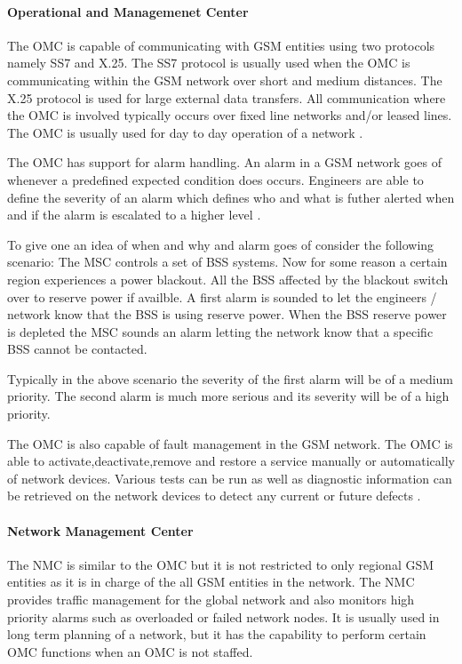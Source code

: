 \paragraph{Operational and Managemenet Center}
The OMC is capable of communicating with GSM entities using two protocols namely SS7 and X.25. The SS7 protocol is usually used when the OMC is communicating within the GSM network over short and medium distances. The X.25 protocol is used for large external data transfers. All communication where the OMC is involved typically occurs over fixed line networks and/or leased lines. The OMC is usually used for day to day operation of a network \cite{GSMSysEngin}.

The OMC has support for alarm handling. An alarm in a GSM network goes of whenever a predefined expected condition does occurs. Engineers are able to define the severity of an alarm which defines who and what is futher alerted when and if the alarm is escalated to a higher level \cite{GSMSysEngin}.

To give one an idea of when and why and alarm goes of consider the following scenario: The MSC controls a set of BSS systems. Now for some reason a certain region experiences a power blackout. All the BSS affected by the blackout switch over to reserve power if availble. A first alarm is sounded to let the engineers / network know that the BSS is using reserve power. When the BSS reserve power is depleted the MSC sounds an alarm letting the network know that a specific BSS cannot be contacted.

Typically in the above scenario the severity of the first alarm will be of a medium priority. The second alarm is much more serious and its severity will be of a high priority.

The OMC is also capable of fault management in the GSM network. The OMC is able to activate,deactivate,remove and restore a service manually or automatically of network devices. Various tests can be run as well as diagnostic information can be retrieved on the network devices to detect any current or future defects \cite{GSMSysEngin}.

\paragraph{Network Management Center}
The NMC is similar to the OMC but it is not restricted to only regional GSM entities as it is in charge of the all GSM entities in the network. The NMC provides traffic management for the global network and also monitors high priority alarms such as overloaded or failed network nodes. It is usually used in long term planning of a network, but it has the capability to perform certain OMC functions when an OMC is not staffed. 


